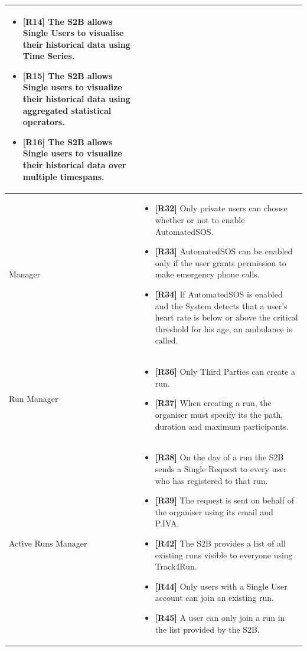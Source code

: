 \documentclass[titlepage]{article}
\begin{document}
\begin{longtable}{| p{5 cm} | p{8 cm} |}
\begin{itemize}
			\item {\bf [R14]} The S2B allows Single Users to visualise their historical data using Time Series. 
			\item {\bf [R15]} The S2B allows Single users to visualize their historical data using aggregated statistical operators. 
			\item {\bf [R16]} The S2B allows Single users to visualize their historical data over multiple timespans.
		\end{itemize}		
		\\	 \hline
		\newline {\it AutomatedSOS} Manager & 
		\begin{itemize}
			\item {\bf [R32]} Only private users can choose whether or not to enable AutomatedSOS. 
			\item {\bf [R33]} AutomatedSOS can be enabled only if the user grants permission to make emergency phone calls. 
			\item {\bf [R34]} If AutomatedSOS is enabled and the System detects that a user’s heart rate is below or above the critical threshold for his age, an ambulance is called. 
		\end{itemize}		
		\\	 \hline
		\newline Run Manager & 
		\begin{itemize}
			\item {\bf [R36]} Only Third Parties can create a run.
			\item {\bf [R37]} When creating a run, the organiser must specify its the path, duration and maximum participants.
		\end{itemize}		
		\\	 \hline	
		\newline Active Runs Manager & 
		\begin{itemize}
			\item {\bf [R38]} On the day of a run the S2B sends a Single Request to every user who has registered to that run.
			\item {\bf [R39]} The request is sent on behalf of the organiser using its email and P.IVA.
			\item {\bf [R42]} The S2B provides a list of all existing runs visible to everyone using Track4Run.
			\item {\bf [R44]} Only users with a Single User account can join an existing run.
			\item {\bf [R45]} A user can only join a run in the list provided by the S2B.

\end{itemize}
\end{longtable}
\end{document}
